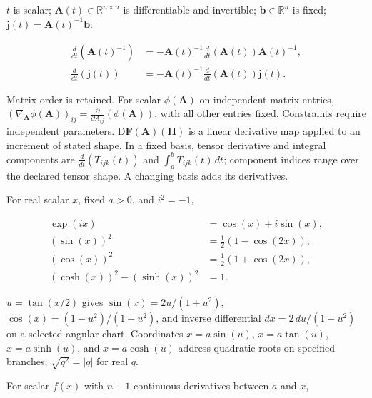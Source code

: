 \documentclass[11pt,oneside,openany]{book}
\begin{document}
\hfill%
\begin{minipage}[t]{0.485\textwidth}\vspace{0pt}

\(t\) is scalar; \(\mathbf A(t)\in\mathbb R^{n\times n}\) is differentiable and
invertible; \(\mathbf b\in\mathbb R^n\) is fixed;
\(\mathbf j(t)=\mathbf A(t)^{-1}\mathbf b\):

\[
\begin{aligned}
\frac{d}{dt}(\mathbf A(t)^{-1})
&=-\mathbf A(t)^{-1}\frac{d}{dt}(\mathbf A(t))\mathbf A(t)^{-1},\\
\frac{d}{dt}(\mathbf j(t))
&=-\mathbf A(t)^{-1}\frac{d}{dt}(\mathbf A(t))\mathbf j(t).
\end{aligned}
\]

Matrix order is retained. For scalar \(\phi(\mathbf A)\) on independent matrix
entries, \((\nabla_{\mathbf A}\phi(\mathbf A))_{ij}=\frac{\partial}{\partial A_{ij}}(\phi(\mathbf A))\), with all other entries fixed.
Constraints require independent parameters. \(\mathrm D\mathbf F(\mathbf A)(\mathbf H)\)
is a linear derivative map applied to an increment of stated shape.
In a fixed basis, tensor derivative and integral components are
\(\frac{d}{dt}(T_{ijk}(t))\) and \(\int_a^bT_{ijk}(t)\,dt\); component indices range
over the declared tensor shape. A changing basis adds its derivatives.

\begingroup{}\color{TrickPurple}

For real scalar \(x\), fixed \(a>0\), and \(i^2=-1\),

\[
\begin{aligned}
\exp(ix)&=\cos(x)+i\sin(x),\\
(\sin(x))^2&=\tfrac12(1-\cos(2x)),\\
(\cos(x))^2&=\tfrac12(1+\cos(2x)),\\
(\cosh(x))^2-(\sinh(x))^2&=1.
\end{aligned}
\]

\(u=\tan(x/2)\) gives \(\sin(x)=2u/(1+u^2)\),
\(\cos(x)=(1-u^2)/(1+u^2)\), and inverse differential
\(dx=2\,du/(1+u^2)\) on a selected angular chart.
Coordinates \(x=a\sin(u)\), \(x=a\tan(u)\), \(x=a\sinh(u)\), and \(x=a\cosh(u)\)
address quadratic roots on specified branches; \(\sqrt{q^2}=|q|\) for real \(q\).


For scalar \(f(x)\) with \(n+1\) continuous derivatives between \(a\) and \(x\),


\end{minipage}
\end{document}
